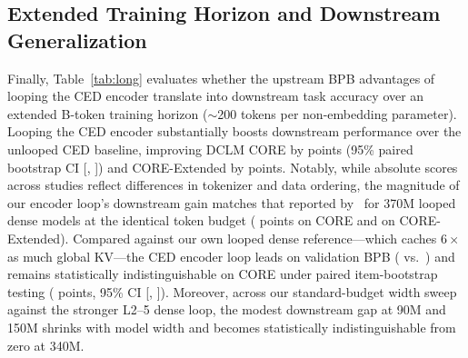 \subsection{Extended Training Horizon and Downstream Generalization}
\label{sec:res-long}


Finally, Table~\ref{tab:long} evaluates whether the upstream BPB advantages of looping the CED encoder translate into downstream task accuracy over an extended B-token training horizon ($\sim$200 tokens per non-embedding parameter). Looping the CED encoder substantially boosts downstream performance over the unlooped CED baseline, improving DCLM CORE by  points (95\% paired bootstrap CI [, ]) and CORE-Extended by  points. Notably, while absolute scores across studies reflect differences in tokenizer and data ordering, the magnitude of our encoder loop's downstream gain matches that reported by~\citet{parcae} for 370M looped dense models at the identical token budget ( points on CORE and  on CORE-Extended). Compared against our own looped dense reference—which caches $6\times$ as much global KV—the CED encoder loop leads on validation BPB ( vs.\ ) and remains statistically indistinguishable on CORE under paired item-bootstrap testing ( points, 95\% CI [, ]). Moreover, across our standard-budget width sweep against the stronger L2--5 dense loop, the modest downstream gap at 90M and 150M shrinks with model width and becomes statistically indistinguishable from zero at 340M.

